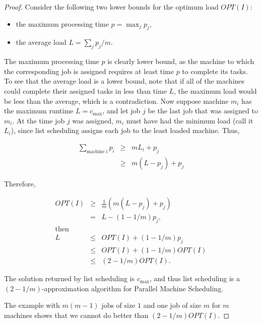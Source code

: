 \documentclass{article}
\begin{document}
\begin{proof}

Consider the following two lower bounds for the optimum load $OPT(I)$:

\begin{itemize}

\item the maximum processing time $p = \max_j p_j,$
\item the average load $L = \sum_j p_j/m.$

\end{itemize}

The maximum processing time $p$ is clearly lower bound, as the machine to which the corresponding
job is assigned requires at least time $p$ to complete its tasks. To see that the average load is
a lower bound, note that if all of the machines could complete their assigned tasks in less than
time $L$, the maximum load would be less than the average, which is a contradiction. Now suppose
machine $m_i$ has the maximum runtime $L = c_{\max}$, and let job $j$ be the last job that was
assigned to $m_i$. At the time job $j$ was assigned, $m_i$ must have had the minimum load (call it
$L_i$), since list scheduling assigns each job to the least loaded machine. Thus,

$$
\begin{array}{lcl}
\sum\limits_{\mbox{machine i}} p_i  & \ge & m L_i + p_j \\
                                    & \ge & m (L - p_j) + p_j
\end{array}
$$

Therefore,

$$
\begin{array} {lcl}
OPT(I)  & \ge & \frac{1}{m} \left( m (L - p_j) + p_j \right) \\
        & = & L - (1-1/m) p_j, \\
\mbox{then}        \\
L       & \le & OPT(I) + (1 - 1/m) p_j \\
        & \le & OPT(I) + (1 - 1/m) OPT(I) \\
        & \le & (2 - 1/m) OPT(I).
\end{array}
$$

The solution returned by list scheduling is $c_{\max}$, and thus list scheduling is a
$(2-1/m)$-approximation algorithm for Parallel Machine Scheduling.

The example with $m(m-1)$ jobs of size $1$ and one job of size $m$ for $m$ machines shows that we
cannot do better than $(2-1/m)OPT(I)$.

\end{proof}
\end{document}
